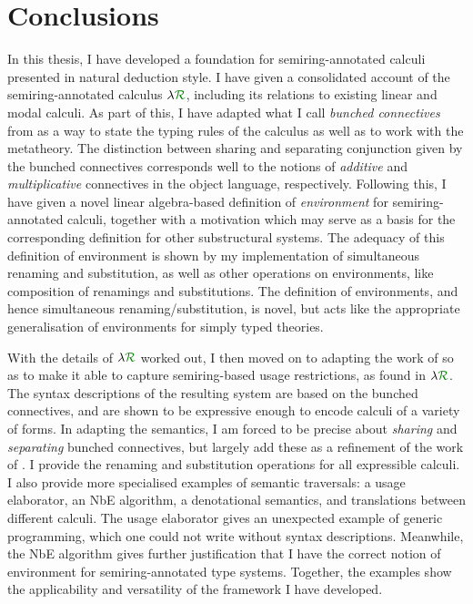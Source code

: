 \chapter{Conclusions}\label{sec:conc}

In this thesis, I have developed a foundation for semiring-annotated calculi
presented in natural deduction style.
I have given a consolidated account of the semiring-annotated calculus $\name$,
including its relations to existing linear and modal calculi.
As part of this, I have adapted what I call \emph{bunched connectives} from
\citet{RPKV20} as a way to state the typing rules of the calculus as well as to
work with the metatheory.
The distinction between sharing and separating conjunction given by the bunched
connectives corresponds well to the notions of \emph{additive} and
\emph{multiplicative} connectives in the object language, respectively.
Following this, I have given a novel linear algebra-based definition of
\emph{environment} for semiring-annotated calculi, together with a motivation
which may serve as a basis for the corresponding definition for other
substructural systems.
The adequacy of this definition of environment is shown by my implementation of
simultaneous renaming and substitution, as well as other operations on
environments, like composition of renamings and substitutions.
The definition of environments, and hence simultaneous renaming/substitution, is
novel, but acts like the appropriate generalisation of environments for simply
typed theories.

With the details of $\name$ worked out, I then moved on to adapting the work of
\citet{AACMM21} so as to make it able to capture semiring-based usage
restrictions, as found in $\name$.
The syntax descriptions of the resulting system are based on the bunched
connectives, and are shown to be expressive enough to encode calculi of a
variety of forms.
In adapting the semantics, I am forced to be precise about \emph{sharing} and
\emph{separating} bunched connectives, but largely add these as a refinement of
the work of \citet{AACMM21}.
I provide the renaming and substitution operations for all expressible calculi.
I also provide more specialised examples of semantic traversals:
a usage elaborator, an NbE algorithm, a denotational semantics, and translations
between different calculi.
The usage elaborator gives an unexpected example of generic programming, which
one could not write without syntax descriptions.
Meanwhile, the NbE algorithm gives further justification that I have the correct
notion of environment for semiring-annotated type systems.
Together, the examples show the applicability and versatility of the framework
I have developed.

